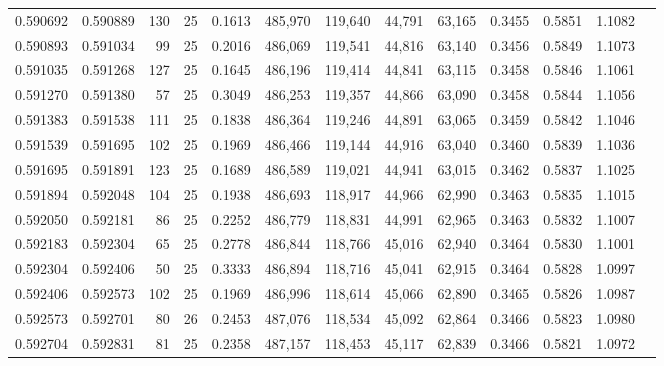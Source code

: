 \begin{tabular}{rrrrrrrrrrrrr}
0.590692 & 0.590889 &   130 &  25 &                                     0.1613 & 485,970 & 119,640 &  44,791 &  63,165 & 0.3455 & 0.5851 & 1.1082 \\
0.590893 & 0.591034 &    99 &  25 &                                     0.2016 & 486,069 & 119,541 &  44,816 &  63,140 & 0.3456 & 0.5849 & 1.1073 \\
0.591035 & 0.591268 &   127 &  25 &                                     0.1645 & 486,196 & 119,414 &  44,841 &  63,115 & 0.3458 & 0.5846 & 1.1061 \\
0.591270 & 0.591380 &    57 &  25 &                                     0.3049 & 486,253 & 119,357 &  44,866 &  63,090 & 0.3458 & 0.5844 & 1.1056 \\
0.591383 & 0.591538 &   111 &  25 &                                     0.1838 & 486,364 & 119,246 &  44,891 &  63,065 & 0.3459 & 0.5842 & 1.1046 \\
0.591539 & 0.591695 &   102 &  25 &                                     0.1969 & 486,466 & 119,144 &  44,916 &  63,040 & 0.3460 & 0.5839 & 1.1036 \\
0.591695 & 0.591891 &   123 &  25 &                                     0.1689 & 486,589 & 119,021 &  44,941 &  63,015 & 0.3462 & 0.5837 & 1.1025 \\
0.591894 & 0.592048 &   104 &  25 &                                     0.1938 & 486,693 & 118,917 &  44,966 &  62,990 & 0.3463 & 0.5835 & 1.1015 \\
0.592050 & 0.592181 &    86 &  25 &                                     0.2252 & 486,779 & 118,831 &  44,991 &  62,965 & 0.3463 & 0.5832 & 1.1007 \\
0.592183 & 0.592304 &    65 &  25 &                                     0.2778 & 486,844 & 118,766 &  45,016 &  62,940 & 0.3464 & 0.5830 & 1.1001 \\
0.592304 & 0.592406 &    50 &  25 &                                     0.3333 & 486,894 & 118,716 &  45,041 &  62,915 & 0.3464 & 0.5828 & 1.0997 \\
0.592406 & 0.592573 &   102 &  25 &                                     0.1969 & 486,996 & 118,614 &  45,066 &  62,890 & 0.3465 & 0.5826 & 1.0987 \\
0.592573 & 0.592701 &    80 &  26 &                                     0.2453 & 487,076 & 118,534 &  45,092 &  62,864 & 0.3466 & 0.5823 & 1.0980 \\
0.592704 & 0.592831 &    81 &  25 &                                     0.2358 & 487,157 & 118,453 &  45,117 &  62,839 & 0.3466 & 0.5821 & 1.0972 \\

\end{tabular}
